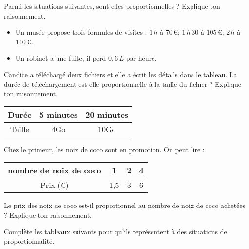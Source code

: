 \begin{pageParcoursu} 

 
Parmi les situations suivantes, sont-elles proportionnelles ? Explique ton raisonnement.
\begin{itemize}[leftmargin=*]
 \item Un musée propose trois formules de visites : $1\,h$ à $70\,$\euro ; $1\,h\,30$ à $105\,$\euro ; $2\,h$ à $140\,$\euro. 
 \item Un robinet a une fuite, il perd $0,6\,L$ par heure. 
\end{itemize}



Candice a téléchargé deux fichiers et elle a écrit les détails dans le tableau. La durée de téléchargement est-elle proportionnelle à la taille du fichier ? Explique ton raisonnement.

\begin{center}
\begin{tabular}{|c|c|c|}
\hline 
Durée & 5 minutes & 20 minutes \\ 
\hline 
Taille & 4Go & 10Go  \\ 
\hline 
\end{tabular} 
\end{center}
 

Chez le primeur, les noix de coco sont en promotion. On peut lire :
\begin{center}
\begin{tabular}{|c|c|c|c|}
\hline 
nombre de noix de coco& 1 & 2 & 4 \\ 
\hline 
Prix (\euro) & 1,5 & 3  & 6  \\ 
\hline 
\end{tabular} 
\end{center}
Le prix des  noix de coco est-il proportionnel au nombre de  noix de coco achetées ? Explique ton raisonnement.
 




Complète les tableaux suivants pour qu'ils représentent à des situations de proportionnalité.


\end{pageParcoursu}
